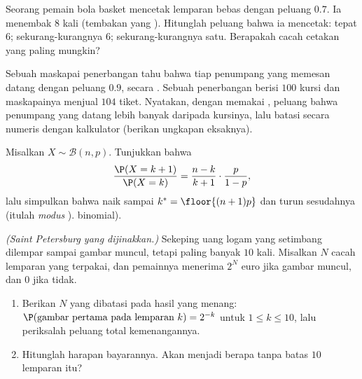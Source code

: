 \begin{exercise}[$\star\star$]\label{exo:g12:randvar:5}
Seorang pemain bola basket mencetak lemparan bebas dengan peluang $0.7$. Ia menembak
$8$ kali (tembakan yang ). Hitunglah peluang bahwa ia mencetak:
tepat $6$; sekurang-kurangnya $6$; sekurang-kurangnya satu. Berapakah cacah cetakan yang
paling mungkin?
\end{exercise}

\begin{exercise}[$\star\star$]\label{exo:g12:randvar:6}
Sebuah maskapai penerbangan tahu bahwa tiap penumpang yang memesan datang dengan peluang
$0.9$, secara . Sebuah penerbangan berisi $100$ kursi dan maskapainya menjual $104$
tiket. Nyatakan, dengan memakai , peluang bahwa penumpang
yang datang lebih banyak daripada kursinya, lalu batasi secara numeris dengan
kalkulator (berikan ungkapan eksaknya).
\end{exercise}

\begin{exercise}[$\star\star$]\label{exo:g12:randvar:7}
Misalkan $X \sim \mathcal B(n, p)$. Tunjukkan bahwa
\[
\frac{\P(X = k+1)}{\P(X = k)} = \frac{n-k}{k+1}\cdot\frac{p}{1-p},
\]
lalu simpulkan bahwa  naik sampai
$k^* = \floor{(n+1)p}$ dan turun sesudahnya (itulah \emph{modus} ).
binomial).
\end{exercise}

\begin{exercise}[$\star\star\star$]\label{exo:g12:randvar:8}
\emph{(Saint Petersburg yang dijinakkan.)} Sekeping uang logam yang setimbang dilempar sampai gambar
muncul, tetapi paling banyak $10$ kali. Misalkan $N$ cacah lemparan yang terpakai, dan
pemainnya menerima $2^N$ euro jika gambar muncul, dan $0$ jika tidak.
\begin{enumerate}
  \item Berikan  $N$ yang dibatasi pada hasil yang menang:
        $\P(\text{gambar pertama pada lemparan } k) = 2^{-k}$ untuk
        $1 \leq k \leq 10$, lalu periksalah peluang total kemenangannya.
  \item Hitunglah harapan bayarannya. Akan menjadi berapa tanpa batas
        $10$ lemparan itu?
\end{enumerate}
\end{exercise}

